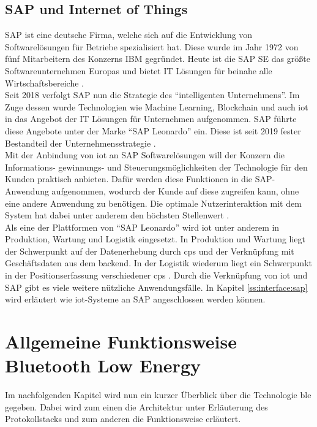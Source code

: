 \subsection{SAP und Internet of Things}
\label{ss:grundlagen:sap}

\noindent SAP ist eine deutsche Firma, welche sich auf die Entwicklung von Softwarelösungen für Betriebe spezialisiert hat. Diese wurde im Jahr 1972 von fünf Mitarbeitern des Konzerns IBM gegründet. Heute ist die SAP SE das größte Softwareunternehmen Europas und bietet IT Lösungen für beinahe alle Wirtschaftsbereiche \cite{SAP20:WWW}.\\
\noindent Seit 2018 verfolgt SAP nun die Strategie des "`intelligenten Unternehmens"'. Im Zuge dessen wurde Technologien wie Machine Learning, Blockchain und auch \ac{iot} in das Angebot der IT Lösungen für Unternehmen aufgenommen. SAP führte diese Angebote unter der Marke "`SAP Leonardo"' ein. Diese ist seit 2019 fester Bestandteil der Unternehmensstrategie \cite[Seite 102f]{Holtschulte20:IOS}.\\ 
\noindent Mit der Anbindung von \ac{iot} an SAP Softwarelösungen will der Konzern die Informations- gewinnungs- und Steuerungsmöglichkeiten der Technologie für den Kunden praktisch anbieten. Dafür werden diese Funktionen in die SAP-Anwendung aufgenommen, wodurch der Kunde auf diese zugreifen kann, ohne eine andere Anwendung zu benötigen. Die optimale Nutzerinteraktion mit dem System hat dabei unter anderem den höchsten Stellenwert \cite[Seite 105f]{Holtschulte20:IOS}.\\
\noindent Als eine der Plattformen von "`SAP Leonardo"' wird \ac{iot} unter anderem in Produktion, Wartung und Logistik eingesetzt. In Produktion und Wartung liegt der Schwerpunkt auf der Datenerhebung durch \ac{cps} und der Verknüpfung mit Geschäftsdaten aus dem backend. In der Logistik wiederum liegt ein Schwerpunkt in der Positionserfassung verschiedener \ac{cps} \cite[Seite 107ff]{Holtschulte20:IOS}. Durch die Verknüpfung von \ac{iot} und SAP gibt es viele weitere nützliche Anwendungsfälle. In Kapitel \ref{ss:interface:sap} wird erläutert wie \ac{iot}-Systeme an SAP angeschlossen werden können.\\

\section{Allgemeine Funktionsweise Bluetooth Low Energy}
\label{s:funktionsweise}

\noindent Im nachfolgenden Kapitel wird nun ein kurzer Überblick über die Technologie \ac{ble} gegeben. Dabei wird zum einen die Architektur unter Erläuterung des Protokollstacks und zum anderen die Funktionsweise erläutert.\\   

